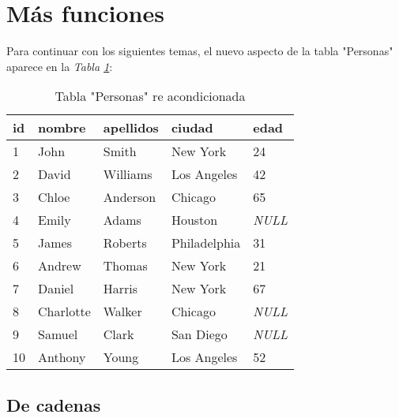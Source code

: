\section{Más funciones}

Para continuar con los siguientes temas, el nuevo aspecto de la tabla "Personas" aparece en la \textit{Tabla \ref{tab: 26}}:
\begin{table}[H]
    \centering
    \caption{Tabla "Personas" re acondicionada}
    \label{tab: 26}
    \begin{tabular}{|l|l|l|l|l|}
        \hline
        \textbf{id} & \textbf{nombre} & \textbf{apellidos} & \textbf{ciudad} & \textbf{edad} \\
        \hline
        1 & John        & Smith     & New York      & 24 \\
        \hline
        2 & David       & Williams  & Los Angeles   & 42 \\
        \hline
        3 & Chloe       & Anderson  & Chicago       & 65 \\
        \hline
        4 & Emily       & Adams     & Houston       & \textit{NULL} \\
        \hline
        5 & James       & Roberts   & Philadelphia  & 31 \\
        \hline
        6 & Andrew      & Thomas    & New York      & 21 \\
        \hline
        7 & Daniel      & Harris    & New York      & 67 \\
        \hline
        8 & Charlotte   & Walker    & Chicago       & \textit{NULL} \\
        \hline
        9 & Samuel      & Clark     & San Diego     & \textit{NULL} \\
        \hline
        10 & Anthony    & Young     & Los Angeles   & 52 \\
        \hline
    \end{tabular}
\end{table}


\subsection{De cadenas}

